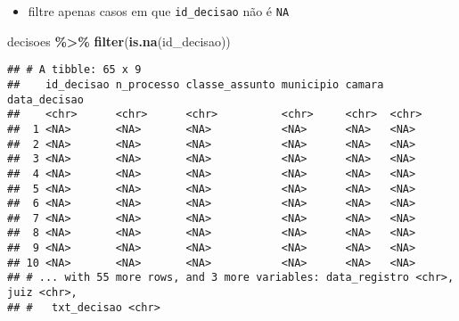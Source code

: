 \documentclass[
  10pt,
  ignorenonframetext,
]{beamer}
\newenvironment{Shaded}{\begin{snugshade}}{\end{snugshade}}
\newcommand{\KeywordTok}[1]{\textcolor[rgb]{0.13,0.29,0.53}{\textbf{#1}}}
\newcommand{\NormalTok}[1]{#1}
\newcommand{\OperatorTok}[1]{\textcolor[rgb]{0.81,0.36,0.00}{\textbf{#1}}}
\newcommand{\StringTok}[1]{\textcolor[rgb]{0.31,0.60,0.02}{#1}}
\providecommand{\tightlist}{%
  \setlength{\itemsep}{0pt}\setlength{\parskip}{0pt}}
\begin{document}
\begin{frame}[fragile]{}
\protect\hypertarget{section}{}
\begin{itemize}
\tightlist
\item
  filtre apenas casos em que \texttt{id\_decisao} não é \texttt{NA}
\end{itemize}

\begin{Shaded}
\begin{Highlighting}[]
\NormalTok{decisoes }\OperatorTok{\%\textgreater{}\%}\StringTok{ }
\StringTok{  }\KeywordTok{filter}\NormalTok{(}\KeywordTok{is.na}\NormalTok{(id\_decisao))}
\end{Highlighting}
\end{Shaded}

\begin{verbatim}
## # A tibble: 65 x 9
##    id_decisao n_processo classe_assunto municipio camara data_decisao
##    <chr>      <chr>      <chr>          <chr>     <chr>  <chr>       
##  1 <NA>       <NA>       <NA>           <NA>      <NA>   <NA>        
##  2 <NA>       <NA>       <NA>           <NA>      <NA>   <NA>        
##  3 <NA>       <NA>       <NA>           <NA>      <NA>   <NA>        
##  4 <NA>       <NA>       <NA>           <NA>      <NA>   <NA>        
##  5 <NA>       <NA>       <NA>           <NA>      <NA>   <NA>        
##  6 <NA>       <NA>       <NA>           <NA>      <NA>   <NA>        
##  7 <NA>       <NA>       <NA>           <NA>      <NA>   <NA>        
##  8 <NA>       <NA>       <NA>           <NA>      <NA>   <NA>        
##  9 <NA>       <NA>       <NA>           <NA>      <NA>   <NA>        
## 10 <NA>       <NA>       <NA>           <NA>      <NA>   <NA>        
## # ... with 55 more rows, and 3 more variables: data_registro <chr>, juiz <chr>,
## #   txt_decisao <chr>
\end{verbatim}
\end{frame}
\end{document}
